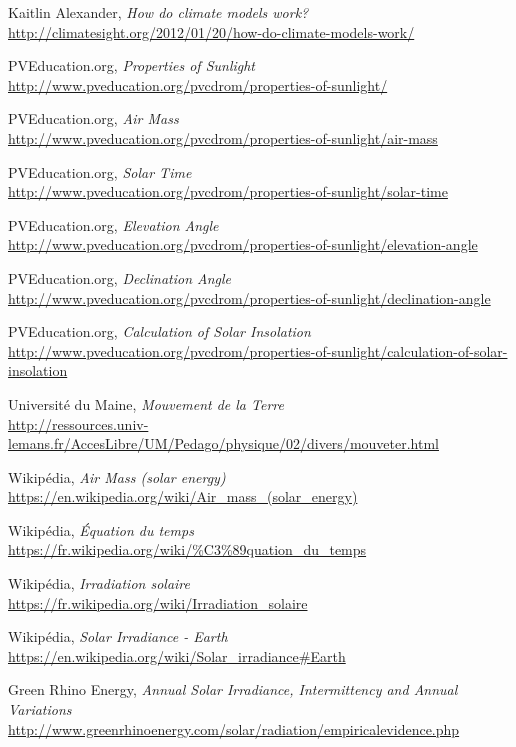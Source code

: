 \documentclass[12pt]{article}
\begin{document}
\clearpage
\begin{thebibliography}{99}

	Kaitlin Alexander,
	\emph{How do climate models work?}\\
	\url{http://climatesight.org/2012/01/20/how-do-climate-models-work/}

	PVEducation.org,
	\emph{Properties of Sunlight}\\
	\url{http://www.pveducation.org/pvcdrom/properties-of-sunlight/}

	PVEducation.org,
	\emph{Air Mass}\\
	\url{http://www.pveducation.org/pvcdrom/properties-of-sunlight/air-mass}

	PVEducation.org,
	\emph{Solar Time}\\
	\url{http://www.pveducation.org/pvcdrom/properties-of-sunlight/solar-time}

	PVEducation.org,
	\emph{Elevation Angle}\\
	\url{http://www.pveducation.org/pvcdrom/properties-of-sunlight/elevation-angle}

	PVEducation.org,
	\emph{Declination Angle}\\
	\url{http://www.pveducation.org/pvcdrom/properties-of-sunlight/declination-angle}

	PVEducation.org,
	\emph{Calculation of Solar Insolation}\\
	\url{http://www.pveducation.org/pvcdrom/properties-of-sunlight/calculation-of-solar-insolation}

	Université du Maine,
	\emph{Mouvement de la Terre}\\
	\url{http://ressources.univ-lemans.fr/AccesLibre/UM/Pedago/physique/02/divers/mouveter.html}

	Wikipédia,
	\emph{Air Mass (solar energy)}\\
	\url{https://en.wikipedia.org/wiki/Air_mass_(solar_energy)}

	Wikipédia,
	\emph{Équation du temps}\\
	\url{https://fr.wikipedia.org/wiki/%C3%89quation_du_temps}
	
	Wikipédia,
	\emph{Irradiation solaire}\\
	\url{https://fr.wikipedia.org/wiki/Irradiation_solaire}
	
	Wikipédia,
	\emph{Solar Irradiance - Earth}\\
	\url{https://en.wikipedia.org/wiki/Solar_irradiance#Earth}
	
	Green Rhino Energy,
	\emph{Annual Solar Irradiance, Intermittency and Annual Variations}\\
	\url{http://www.greenrhinoenergy.com/solar/radiation/empiricalevidence.php}

\end{thebibliography}
\end{document}
